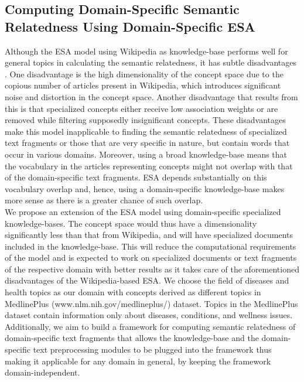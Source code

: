 \documentclass[journal,transmag]{IEEEtran}
\begin{document}
\subsection {\textbf{Computing Domain-Specific Semantic Relatedness Using Domain-Specific ESA}}

Although the ESA model using Wikipedia as knowledge-base performs well for general topics in calculating the semantic relatedness, it has subtle disadvantages \cite{insights}. One disadvantage is the high dimensionality of the concept space due to the copious number of articles present in Wikipedia, which introduces significant noise and distortion in the concept space. Another disadvantage that results from this is that specialized concepts either receive low association weights or are removed while filtering supposedly insignificant concepts. These disadvantages make this model inapplicable to finding the semantic relatedness of specialized text fragments or those that are very specific in nature, but contain words that occur in various domains. Moreover, using a broad knowledge-base means that the vocabulary in the articles representing concepts might not overlap with that of the domain-specific text fragments. ESA depends substantially on this vocabulary overlap and, hence, using a domain-specific knowledge-base makes more sense as there is a greater chance of such overlap.\\
We propose an extension of the ESA model using domain-specific specialized knowledge-bases. The concept space would thus have a dimensionality significantly less than that from Wikipedia, and will have specialized documents included in the knowledge-base. This will reduce the computational requirements of the model and is expected to work on specialized documents or text fragments of the respective domain with better results as it takes care of the aforementioned disadvantages of the Wikipedia-based ESA.  We choose the field of diseases and health topics as our domain with concepts derived as different topics in MedlinePlus (www.nlm.nih.gov/medlineplus/‎) dataset. Topics in the MedlinePlus dataset contain information only about diseases, conditions, and wellness issues.\\
Additionally, we aim to build a framework for computing semantic relatedness of domain-specific text fragments that allows the knowledge-base and the domain-specific text preprocessing modules to be plugged into the framework thus making it applicable for any domain in general, by keeping the framework domain-independent.
\end{document}

